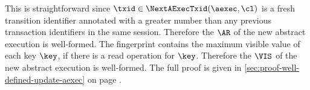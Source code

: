 \begin{proofsketch}
This is straightforward since \(  \txid \in \NextAExecTxid(\aexec,\cl) \) is a fresh transition identifier 
annotated with a greater number than any previous transaction identifiers in the same session.
Therefore the \( \AR \) of the new abstract execution is well-formed.
The fingerprint contains the maximum visible value of each key \( \key \),
if there is a read operation for \( \key \).
Therefore the \( \VIS \) of the new abstract execution is well-formed.
The full proof is given in \cref{sec:proof-well-defined-update-aexec} 
on page \pageref{sec:proof-well-defined-update-aexec}.
\end{proofsketch}



